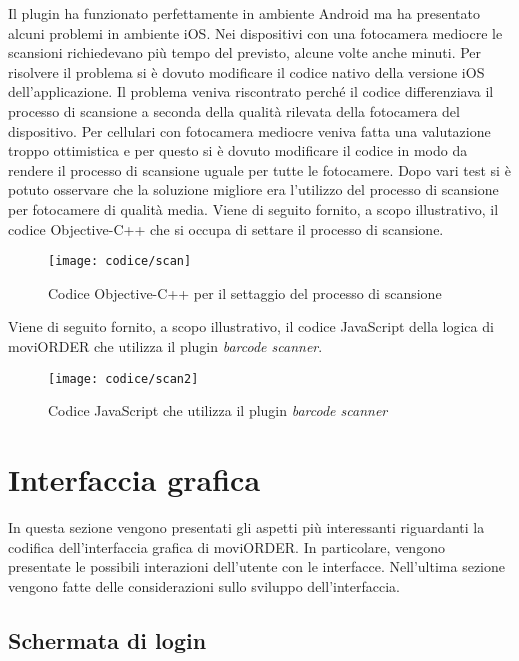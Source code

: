 Il plugin ha funzionato perfettamente in ambiente Android ma ha presentato alcuni problemi in ambiente iOS. Nei dispositivi con una fotocamera mediocre le scansioni richiedevano più tempo del previsto, alcune volte anche minuti. Per risolvere il problema si è dovuto modificare il codice nativo della versione iOS dell'applicazione. Il problema veniva riscontrato perché il codice differenziava il processo di scansione a seconda della qualità rilevata della fotocamera del dispositivo. Per cellulari con fotocamera mediocre veniva fatta una valutazione troppo ottimistica e per questo si è dovuto modificare il codice in modo da rendere il processo di scansione uguale per tutte le fotocamere. Dopo vari test si è potuto osservare che la soluzione migliore era l'utilizzo del processo di scansione per fotocamere di qualità media. Viene di seguito fornito, a scopo illustrativo, il codice Objective-C++ che si occupa di settare il processo di scansione.

\begin{figure}[!h] 
    \centering 
    \texttt{[image: codice/scan]} 
    \caption{Codice Objective-C++ per il settaggio del processo di scansione}
\end{figure}

\newpage

Viene di seguito fornito, a scopo illustrativo, il codice JavaScript della logica di moviORDER che utilizza il plugin \textit{barcode scanner}.

\begin{figure}[!h] 
    \centering 
    \texttt{[image: codice/scan2]} 
    \caption{Codice JavaScript che utilizza il plugin \textit{barcode scanner}}
\end{figure}

\newpage

\section{Interfaccia grafica}

In questa sezione vengono presentati gli aspetti più interessanti riguardanti la codifica dell'interfaccia grafica di moviORDER. In particolare, vengono presentate le possibili interazioni dell'utente con le interfacce. Nell'ultima sezione vengono fatte delle considerazioni sullo sviluppo dell'interfaccia.

\subsection{Schermata di login}

